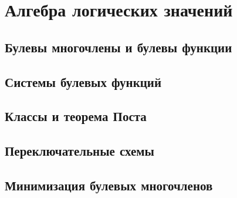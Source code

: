 \section{Алгебра логических значений}
\subsection{Булевы многочлены и булевы функции}
\subsection{Системы булевых функций}
\subsection{Классы и теорема Поста}
\subsection{Переключательные схемы}
\subsection{Минимизация булевых многочленов}